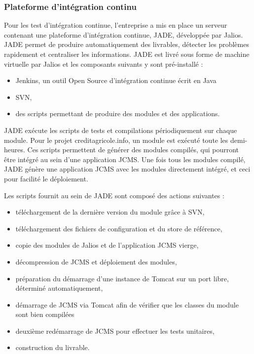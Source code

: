 \documentclass[12pt,a4paper]{article}
\begin{document}
\subsubsection{Plateforme d'intégration continu}
Pour les test d'intégration continue, l'entreprise a mis en place un serveur contenant une plateforme d'intégration continue, \gls{JADE}, développée par Jalios. \gls{JADE} permet de produire automatiquement des livrables, détecter les problèmes rapidement et centraliser les informations. \gls{JADE} est livré sous forme de machine virtuelle par Jalios et les composants suivants y sont pré-installé : 
\begin{itemize}
\item Jenkins, un outil Open Source d'intégration continue écrit en Java
\item \gls{SVN},
\item des scripts permettant de produire des modules et des applications.
\end{itemize}
\gls{JADE} exécute les scripts de tests et compilations périodiquement sur chaque module. Pour le projet creditagricole.info, un module est exécuté toute les demi-heures. Ces scripts permettent de générer des modules compilés, qui pourront être intégré au sein d'une application \gls{JCMS}. Une fois tous les modules compilé, \gls{JADE} génère une application \gls{JCMS} avec les modules directement intégré, et ceci pour facilité le déploiement.\par
Les scripts fournit au sein de \gls{JADE} sont composé des actions suivantes : 
\begin{itemize}
\item téléchargement de la dernière version du module grâce à \gls{SVN},
\item téléchargement des fichiers de configuration et du store de référence,
\item copie des modules de Jalios et de l'application \gls{JCMS} vierge,
\item décompression de \gls{JCMS} et déploiement des modules,
\item préparation du démarrage d'une instance de Tomcat sur un port libre, déterminé automatiquement,
\item démarrage de \gls{JCMS} via Tomcat afin de vérifier que les classes du module sont bien compilées
\item deuxième redémarrage de \gls{JCMS} pour effectuer les tests unitaires,
\item construction du livrable.
\end{itemize}\par 
\end{document}
